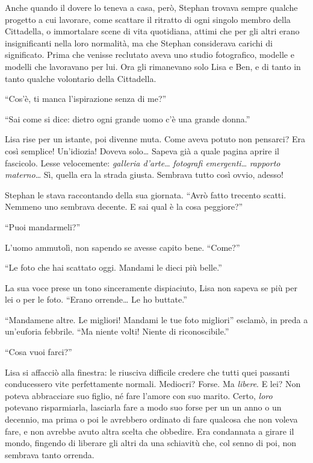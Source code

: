 \documentclass[a4paper,oneside,11pt]{memoir}
\begin{document}


Anche quando il dovere lo teneva a casa, però, Stephan trovava sempre qualche
progetto a cui lavorare, come scattare il ritratto di ogni singolo membro della
Cittadella, o immortalare scene di vita quotidiana, attimi che per gli altri
erano insignificanti nella loro normalità, ma che Stephan considerava carichi di
significato. Prima che venisse reclutato aveva uno studio fotografico, modelle e
modelli che lavoravano per lui. Ora gli rimanevano solo Lisa e Ben, e di tanto
in tanto qualche volontario della Cittadella.

``Cos'è, ti manca l'ispirazione senza di me?''

``Sai come si dice: dietro ogni grande uomo c'è una grande donna.''

Lisa rise per un istante, poi divenne muta. Come aveva potuto non pensarci? Era
così semplice! Un'idiozia! Doveva solo\dots{} Sapeva già a quale pagina aprire
il fascicolo. Lesse velocemente: \emph{galleria d'arte}\dots{} \emph{fotografi
emergenti}\dots{} \emph{rapporto materno}\dots{} Sì, quella era la strada
giusta. Sembrava tutto così ovvio, adesso!

Stephan le stava raccontando della sua giornata. ``Avrò fatto trecento scatti.
Nemmeno uno sembrava decente. E sai qual è la cosa peggiore?''

``Puoi mandarmeli?''

L'uomo ammutolì, non sapendo se avesse capito bene. ``Come?''

``Le foto che hai scattato oggi. Mandami le dieci più belle.''

La sua voce prese un tono sinceramente dispiaciuto, Lisa non sapeva se più per
lei o per le foto. ``Erano orrende\dots{} Le ho buttate.''

``Mandamene altre. Le migliori! Mandami le tue foto migliori'' esclamò, in preda
a un'euforia febbrile. ``Ma niente volti! Niente di riconoscibile.''

``Cosa vuoi farci?''

Lisa si affacciò alla finestra: le riusciva difficile credere che tutti quei
passanti conducessero vite perfettamente normali. Mediocri? Forse. Ma
\emph{libere}. E lei? Non poteva abbracciare suo figlio, né fare l'amore con suo
marito. Certo, \emph{loro} potevano risparmiarla, lasciarla fare a modo suo
forse per un un anno o un decennio, ma prima o poi le avrebbero ordinato di fare
qualcosa che non voleva fare, e non avrebbe avuto altra scelta che obbedire. Era
condannata a girare il mondo, fingendo di liberare gli altri da una schiavitù
che, col senno di poi, non sembrava tanto orrenda.
\end{document}
